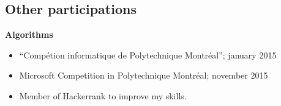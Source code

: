 \documentclass[margin]{res}
\begin{document}
\begin{resume}
  


  \section{Other participations}
  
  {\bf Algorithms}
  \begin{itemize} \itemsep -2pt %
  \item ``Comp\'{e}tion informatique de Polytechnique Montr\'{e}al''; \hfill january 2015
  \item Microsoft Competition in Polytechnique Montr\'{e}al; \hfill november 2015
  \item Member of Hackerrank to improve my skills.
  \end{itemize}

\end{resume} 
\end{document}
